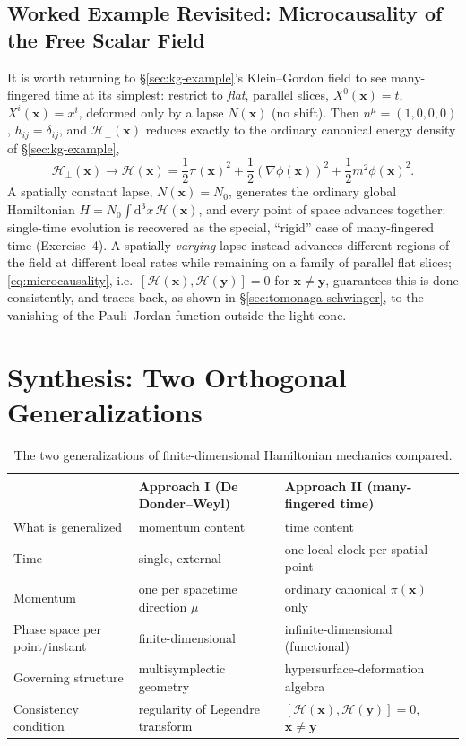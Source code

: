 \documentclass[11pt]{book}
\newcommand{\rd}{\mathrm{d}}
\newcommand{\Ham}{\mathcal{H}}
\theoremstyle{definition}
\theoremstyle{remark}
\begin{document}
\subsection{Worked Example Revisited: Microcausality of the Free Scalar Field}

It is worth returning to \S\ref{sec:kg-example}'s Klein--Gordon field to see many-fingered time at its simplest: restrict to \emph{flat}, parallel slices, $X^0(\mathbf{x})=t$, $X^i(\mathbf{x})=x^i$, deformed only by a lapse $N(\mathbf{x})$ (no shift). Then $n^\mu=(1,0,0,0)$, $h_{ij}=\delta_{ij}$, and $\Ham_\perp(\mathbf{x})$ reduces exactly to the ordinary canonical energy density of \S\ref{sec:kg-example},
\begin{equation}
\Ham_\perp(\mathbf{x}) \to \Ham(\mathbf{x}) = \frac{1}{2}\pi(\mathbf{x})^2 + \frac{1}{2}(\nabla\phi(\mathbf{x}))^2 + \frac{1}{2}m^2\phi(\mathbf{x})^2 .
\end{equation}
A spatially constant lapse, $N(\mathbf{x})=N_0$, generates the ordinary global Hamiltonian $H=N_0\int\rd^3x\,\Ham(\mathbf{x})$, and every point of space advances together: single-time evolution is recovered as the special, ``rigid'' case of many-fingered time (Exercise~4). A spatially \emph{varying} lapse instead advances different regions of the field at different local rates while remaining on a family of parallel flat slices; \eqref{eq:microcausality}, i.e.\ $[\Ham(\mathbf{x}),\Ham(\mathbf{y})]=0$ for $\mathbf{x}\neq\mathbf{y}$, guarantees this is done consistently, and traces back, as shown in \S\ref{sec:tomonaga-schwinger}, to the vanishing of the Pauli--Jordan function outside the light cone.

\section{Synthesis: Two Orthogonal Generalizations}
\label{sec:synthesis}

\begin{table}[h]
\centering
\begin{tabular}{@{}lll@{}}
\toprule
 & Approach I (De Donder--Weyl) & Approach II (many-fingered time) \\
\midrule
What is generalized & momentum content & time content \\
Time & single, external & one local clock per spatial point \\
Momentum & one per spacetime direction $\mu$ & ordinary canonical $\pi(\mathbf{x})$ only \\
Phase space per point/instant & finite-dimensional & infinite-dimensional (functional) \\
Governing structure & multisymplectic geometry & hypersurface-deformation algebra \\
Consistency condition & regularity of Legendre transform & $[\Ham(\mathbf{x}),\Ham(\mathbf{y})]=0$, $\mathbf{x}\neq\mathbf{y}$ \\
\bottomrule
\end{tabular}
\caption{The two generalizations of finite-dimensional Hamiltonian mechanics compared.}
\end{table}
\end{document}
